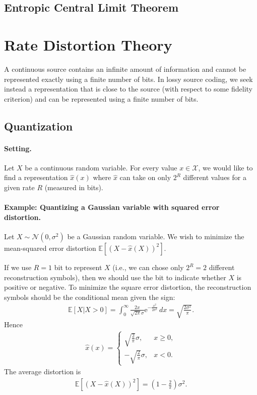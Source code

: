 \documentclass{article}
\numberwithin{equation}{section}
\newcommand{\e}{\mathrm{e}}
\newcommand{\E}{\mathbb{E}}
\renewcommand{\cal}{\mathcal}
\theoremstyle{plain}
\theoremstyle{definition}
\begin{document}
\subsection{Entropic Central Limit Theorem}

\newpage
\section{Rate Distortion Theory}
A continuous source contains an infinite amount of information and cannot be represented exactly using a finite number of bits. In lossy source coding, we seek instead a representation that is close to the source (with
respect to some fidelity criterion) and can be represented using a finite number of bits.
\subsection{Quantization}
\paragraph{Setting.} Let $X$ be a continuous random variable. For every value $x\in\cal{X}$, we would like to find a representation $\hat{x}(x)$ where $\hat{x}$ can take on only $2^R$ different values for a given rate $R$ (measured in bits).

\paragraph{Example: Quantizing a Gaussian variable with squared error distortion.} Let $X\sim\cal{N}(0,\sigma^2)$ be a Gaussian random variable. We wish to minimize the mean-squared error distortion $\E\left[(X-\hat{x}(X))^2\right]$.

If we use $R=1$ bit to represent $X$ (i.e., we can chose only $2^R=2$ different reconstruction symbols), then we should use the bit to indicate whether $X$ is positive or negative. To minimize the square error distortion, the reconstruction symbols should be the conditional mean given the sign:
\begin{align*}
	\E[X|X>0]=\int_0^\infty\frac{2x}{\sqrt{2\pi}\sigma}\e^{-\frac{x^2}{2\sigma^2}}\,dx=\sqrt{\frac{2\sigma^2}{\pi}}.
\end{align*}
Hence
\begin{align*}
	\hat{x}(x)=\begin{cases}
		\sqrt{\frac{2}{\pi}}\sigma, &x\geq 0,\\
		-\sqrt{\frac{2}{\pi}}\sigma, &x< 0.
	\end{cases}
\end{align*}
The average distortion is
\begin{align*}
	\E\left[(X-\hat{x}(X))^2\right]=\left(1-\frac{2}{\pi}\right)\sigma^2.
\end{align*}
\end{document}
